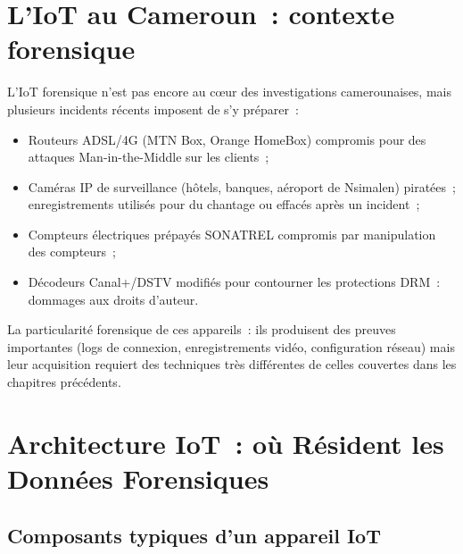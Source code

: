 \bigskip

\section*{L'IoT au Cameroun~: contexte forensique}

L'IoT forensique n'est pas encore au c\oe ur des investigations camerounaises,
mais plusieurs incidents récents imposent de s'y préparer~:

\begin{itemize}
    \item Routeurs ADSL/4G (MTN Box, Orange HomeBox) compromis pour
          des attaques Man-in-the-Middle sur les clients~;
    \item Caméras IP de surveillance (hôtels, banques, aéroport
          de Nsimalen) piratées~; enregistrements utilisés pour
          du chantage ou effacés après un incident~;
    \item Compteurs électriques prépayés SONATREL compromis
          par manipulation des compteurs~;
    \item Décodeurs Canal+/DSTV modifiés pour contourner les
          protections DRM~: dommages aux droits d'auteur.
\end{itemize}

La particularité forensique de ces appareils~: ils produisent des
preuves importantes (logs de connexion, enregistrements vidéo,
configuration réseau) mais leur acquisition requiert des techniques
très différentes de celles couvertes dans les chapitres précédents.

\separateur

\section{Architecture IoT~: où Résident les Données Forensiques}
\label{sec:architecture-iot}

\subsection{Composants typiques d'un appareil IoT}

